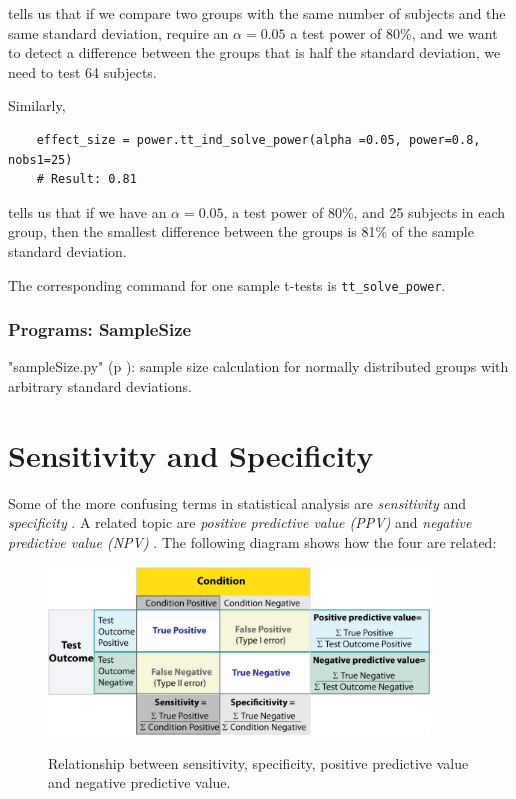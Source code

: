 tells us that if we compare two groups with the same number of subjects and the same standard deviation, require an $\alpha=0.05$ a test power of $80\%$, and we want to detect a difference between the groups that is half the standard deviation, we need to test 64 subjects.

Similarly,

\begin{lstlisting}
    effect_size = power.tt_ind_solve_power(alpha =0.05, power=0.8, nobs1=25)
    # Result: 0.81
\end{lstlisting}

tells us that if we have an $\alpha=0.05$, a test power of $80\%$, and 25 subjects in each group, then the smallest difference between the groups is 81\% of the sample standard deviation.

The corresponding command for one sample t-tests is \lstinline{tt_solve_power}.

\subsubsection{Programs: SampleSize}

\PyImg "sampleSize.py" (p \pageref{py:sampleSize}): sample size calculation for normally distributed groups with arbitrary standard deviations.


\section{Sensitivity and Specificity}

Some of the more confusing terms in statistical analysis are \emph{sensitivity}  and \emph{specificity} . A related topic are \emph{positive predictive value (PPV)}  and \emph{negative predictive value (NPV)} . The following diagram shows how the four are related:

\begin{figure}[ht]
  \centering
  \includegraphics[width=0.9\textwidth]{../Images/Sensitivity_Specificity_Diagram.jpg}\\
  \caption{Relationship between sensitivity, specificity, positive predictive value and negative predictive value.}\label{fig:sens_spec_diagram}
\end{figure}

